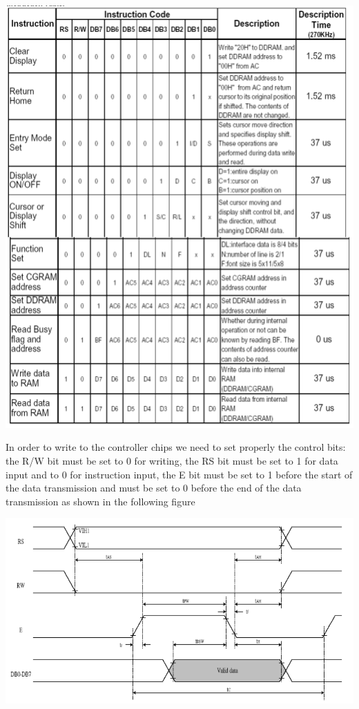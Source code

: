 \documentclass[]{article}
\begin{document}
\begin{center}
    \includegraphics[scale=0.6]{lcd_instruction}
\end{center}
In order to write to the controller chips we need to set properly the control bits: the R/W bit must be set to 0 for writing,
the RS bit must be set to 1 for data input and to 0 for instruction input, the E bit must be set to 1 before the start of the data transmission
and must be set to 0 before the end of the data transmission as shown in the following figure

\begin{center}
    \includegraphics[scale=0.5]{lcd_writing}
\end{center}
\end{document}
